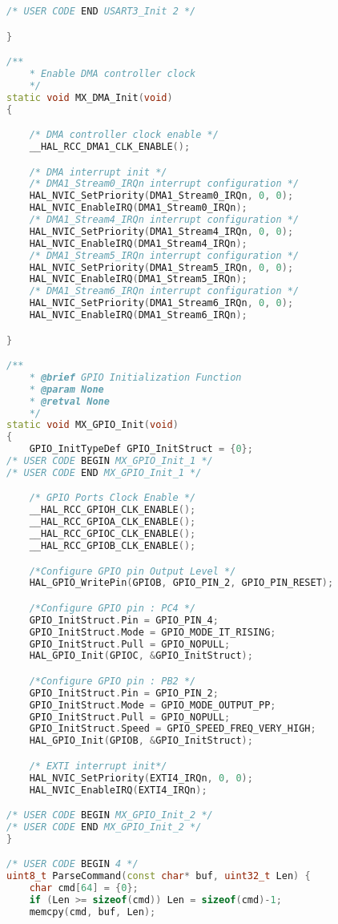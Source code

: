\begin{lstlisting}[language=C++]
    /* USER CODE END USART3_Init 2 */

}

/**
    * Enable DMA controller clock
    */
static void MX_DMA_Init(void)
{

    /* DMA controller clock enable */
    __HAL_RCC_DMA1_CLK_ENABLE();

    /* DMA interrupt init */
    /* DMA1_Stream0_IRQn interrupt configuration */
    HAL_NVIC_SetPriority(DMA1_Stream0_IRQn, 0, 0);
    HAL_NVIC_EnableIRQ(DMA1_Stream0_IRQn);
    /* DMA1_Stream4_IRQn interrupt configuration */
    HAL_NVIC_SetPriority(DMA1_Stream4_IRQn, 0, 0);
    HAL_NVIC_EnableIRQ(DMA1_Stream4_IRQn);
    /* DMA1_Stream5_IRQn interrupt configuration */
    HAL_NVIC_SetPriority(DMA1_Stream5_IRQn, 0, 0);
    HAL_NVIC_EnableIRQ(DMA1_Stream5_IRQn);
    /* DMA1_Stream6_IRQn interrupt configuration */
    HAL_NVIC_SetPriority(DMA1_Stream6_IRQn, 0, 0);
    HAL_NVIC_EnableIRQ(DMA1_Stream6_IRQn);

}

/**
    * @brief GPIO Initialization Function
    * @param None
    * @retval None
    */
static void MX_GPIO_Init(void)
{
    GPIO_InitTypeDef GPIO_InitStruct = {0};
/* USER CODE BEGIN MX_GPIO_Init_1 */
/* USER CODE END MX_GPIO_Init_1 */

    /* GPIO Ports Clock Enable */
    __HAL_RCC_GPIOH_CLK_ENABLE();
    __HAL_RCC_GPIOA_CLK_ENABLE();
    __HAL_RCC_GPIOC_CLK_ENABLE();
    __HAL_RCC_GPIOB_CLK_ENABLE();

    /*Configure GPIO pin Output Level */
    HAL_GPIO_WritePin(GPIOB, GPIO_PIN_2, GPIO_PIN_RESET);

    /*Configure GPIO pin : PC4 */
    GPIO_InitStruct.Pin = GPIO_PIN_4;
    GPIO_InitStruct.Mode = GPIO_MODE_IT_RISING;
    GPIO_InitStruct.Pull = GPIO_NOPULL;
    HAL_GPIO_Init(GPIOC, &GPIO_InitStruct);

    /*Configure GPIO pin : PB2 */
    GPIO_InitStruct.Pin = GPIO_PIN_2;
    GPIO_InitStruct.Mode = GPIO_MODE_OUTPUT_PP;
    GPIO_InitStruct.Pull = GPIO_NOPULL;
    GPIO_InitStruct.Speed = GPIO_SPEED_FREQ_VERY_HIGH;
    HAL_GPIO_Init(GPIOB, &GPIO_InitStruct);

    /* EXTI interrupt init*/
    HAL_NVIC_SetPriority(EXTI4_IRQn, 0, 0);
    HAL_NVIC_EnableIRQ(EXTI4_IRQn);

/* USER CODE BEGIN MX_GPIO_Init_2 */
/* USER CODE END MX_GPIO_Init_2 */
}

/* USER CODE BEGIN 4 */
uint8_t ParseCommand(const char* buf, uint32_t Len) {
    char cmd[64] = {0};
    if (Len >= sizeof(cmd)) Len = sizeof(cmd)-1;
    memcpy(cmd, buf, Len);


\end{lstlisting}
